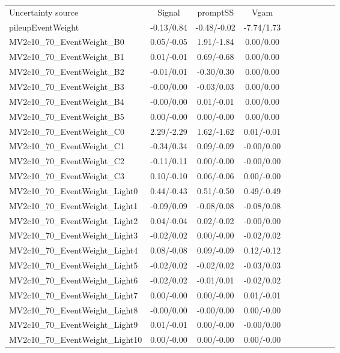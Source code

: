 \begin{table}[h]
\scriptsize
\begin{center}
\begin{tabular}{l|ccccccccc}
\hline
\hline
Uncertainty source &Signal &promptSS &Vgam \\
pileupEventWeight &-0.13/0.84 &-0.48/-0.02 &-7.74/1.73 \\
MV2c10\_70\_EventWeight\_B0 &0.05/-0.05 &1.91/-1.84 &0.00/0.00 \\
MV2c10\_70\_EventWeight\_B1 &0.01/-0.01 &0.69/-0.68 &0.00/0.00 \\
MV2c10\_70\_EventWeight\_B2 &-0.01/0.01 &-0.30/0.30 &0.00/0.00 \\
MV2c10\_70\_EventWeight\_B3 &-0.00/0.00 &-0.03/0.03 &0.00/0.00 \\
MV2c10\_70\_EventWeight\_B4 &-0.00/0.00 &0.01/-0.01 &0.00/0.00 \\
MV2c10\_70\_EventWeight\_B5 &0.00/-0.00 &0.00/-0.00 &0.00/0.00 \\
MV2c10\_70\_EventWeight\_C0 &2.29/-2.29 &1.62/-1.62 &0.01/-0.01 \\
MV2c10\_70\_EventWeight\_C1 &-0.34/0.34 &0.09/-0.09 &-0.00/0.00 \\
MV2c10\_70\_EventWeight\_C2 &-0.11/0.11 &0.00/-0.00 &-0.00/0.00 \\
MV2c10\_70\_EventWeight\_C3 &0.10/-0.10 &0.06/-0.06 &0.00/-0.00 \\
MV2c10\_70\_EventWeight\_Light0 &0.44/-0.43 &0.51/-0.50 &0.49/-0.49 \\
MV2c10\_70\_EventWeight\_Light1 &-0.09/0.09 &-0.08/0.08 &-0.08/0.08 \\
MV2c10\_70\_EventWeight\_Light2 &0.04/-0.04 &0.02/-0.02 &-0.00/0.00 \\
MV2c10\_70\_EventWeight\_Light3 &-0.02/0.02 &0.00/-0.00 &-0.02/0.02 \\
MV2c10\_70\_EventWeight\_Light4 &0.08/-0.08 &0.09/-0.09 &0.12/-0.12 \\
MV2c10\_70\_EventWeight\_Light5 &-0.02/0.02 &-0.02/0.02 &-0.03/0.03 \\
MV2c10\_70\_EventWeight\_Light6 &-0.02/0.02 &-0.01/0.01 &-0.02/0.02 \\
MV2c10\_70\_EventWeight\_Light7 &0.00/-0.00 &0.00/-0.00 &0.01/-0.01 \\
MV2c10\_70\_EventWeight\_Light8 &-0.00/0.00 &-0.00/0.00 &0.00/-0.00 \\
MV2c10\_70\_EventWeight\_Light9 &0.01/-0.01 &0.00/-0.00 &-0.00/0.00 \\
MV2c10\_70\_EventWeight\_Light10 &0.00/-0.00 &0.00/-0.00 &0.00/-0.00 \\

\end{tabular}
\end{center}
\end{table}
